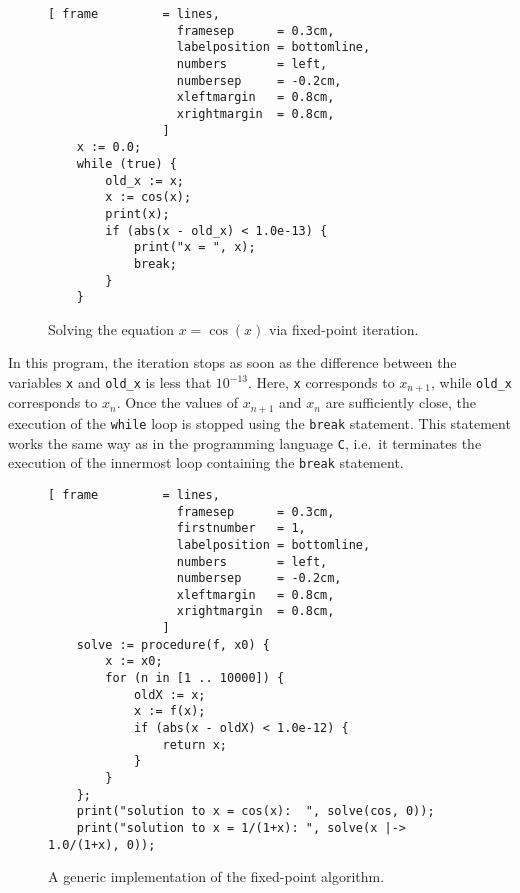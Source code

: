 \begin{figure}[!ht]
  \centering
\begin{Verbatim}[ frame         = lines, 
                  framesep      = 0.3cm, 
                  labelposition = bottomline,
                  numbers       = left,
                  numbersep     = -0.2cm,
                  xleftmargin   = 0.8cm,
                  xrightmargin  = 0.8cm,
                ]
    x := 0.0;
    while (true) {
        old_x := x;
        x := cos(x);    
        print(x);
        if (abs(x - old_x) < 1.0e-13) {
            print("x = ", x);
            break;
        }   
    }
\end{Verbatim} 
\vspace*{-0.3cm}
\caption{Solving the equation $x = \cos(x)$ via fixed-point iteration.}  \label{fig:solve.stlx}
\end{figure} %

In this program, the iteration stops as soon as the difference between the variables \texttt{x} and 
\texttt{old\_x} is less that $10^{-13}$.  Here, \texttt{x} corresponds to $x_{n+1}$, while \texttt{old\_x}
corresponds to $x_n$.  Once the values of $x_{n+1}$ and $x_n$ are sufficiently close, the execution of the \texttt{while} loop
is stopped using the \texttt{break} statement.  This statement works the same way as in the programming language
\texttt{C}, i.e.~it terminates the execution of the innermost loop containing the \texttt{break} statement. 


\begin{figure}[!ht]
\centering
\begin{Verbatim}[ frame         = lines, 
                  framesep      = 0.3cm, 
                  firstnumber   = 1,
                  labelposition = bottomline,
                  numbers       = left,
                  numbersep     = -0.2cm,
                  xleftmargin   = 0.8cm,
                  xrightmargin  = 0.8cm,
                ]
    solve := procedure(f, x0) {
        x := x0;
        for (n in [1 .. 10000]) {
            oldX := x;
            x := f(x);
            if (abs(x - oldX) < 1.0e-12) {
                return x;
            }
        }
    };
    print("solution to x = cos(x):  ", solve(cos, 0));
    print("solution to x = 1/(1+x): ", solve(x |-> 1.0/(1+x), 0));
\end{Verbatim}
\vspace*{-0.3cm}
\caption{A generic implementation of the fixed-point algorithm.}
\label{fig:fixpoint.stlx}
\end{figure}

